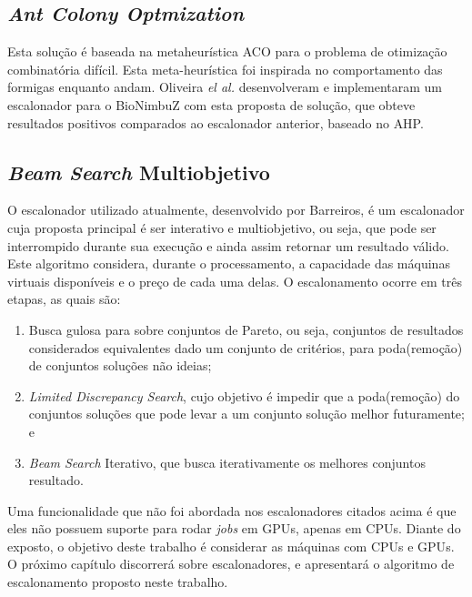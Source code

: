 \subsection{\textit{Ant Colony Optmization}}
Esta solução é baseada na metaheurística \acrfull{ACO}\cite{ACO_DORIGO2005243} para o problema de otimização combinatória difícil. Esta meta-heurística foi inspirada no comportamento das formigas enquanto andam. Oliveira \textit{el al.}\cite{6732620_BioNimbuZ_ACOsched} desenvolveram e implementaram um escalonador para o BioNimbuZ com esta proposta de solução, que obteve resultados positivos comparados ao escalonador anterior, baseado no \acrshort{AHP}.

\subsection{\textit{Beam Search} Multiobjetivo}
O escalonador utilizado atualmente, desenvolvido por Barreiros\cite{BioNimbuZ_Willian_C99}, é um escalonador cuja proposta principal é ser interativo e multiobjetivo, ou seja, que pode ser interrompido durante sua execução e ainda assim retornar um resultado válido. Este algoritmo considera, durante o processamento, a capacidade das máquinas virtuais disponíveis e o preço de cada uma delas. O escalonamento ocorre em três etapas, as quais são:
\begin{enumerate}
	\item Busca gulosa para sobre conjuntos de Pareto, ou seja, conjuntos de resultados considerados equivalentes dado um conjunto de critérios, para poda(remoção) de conjuntos soluções não ideias;
	\item \textit{Limited Discrepancy Search}\cite{Harvey:1995:LDS:1625855.1625935}, cujo objetivo é impedir que a poda(remoção) do conjuntos soluções que pode levar a um conjunto solução melhor futuramente; e
	\item \textit{Beam Search} Iterativo, que busca iterativamente os melhores conjuntos resultado.
\end{enumerate}

Uma funcionalidade que não foi abordada nos escalonadores citados acima é que eles não possuem suporte para rodar \textit{jobs} em \acrshort{GPU}s, apenas em \acrshort{CPU}s. Diante do exposto, o objetivo deste trabalho é considerar as máquinas com \acrshort{CPU}s e \acrshort{GPU}s. O próximo capítulo discorrerá sobre escalonadores, e apresentará o algoritmo de escalonamento proposto neste trabalho.